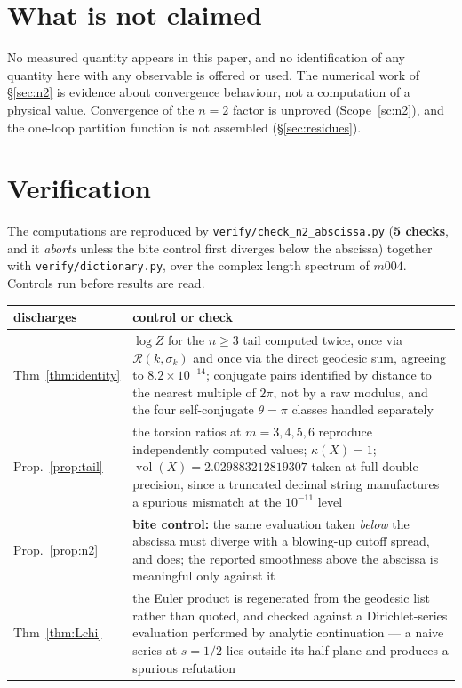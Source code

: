 \documentclass[11pt,a4paper]{article}
\theoremstyle{definition}
\theoremstyle{remark}
\newcommand{\vol}{\operatorname{vol}}
\newcommand{\Rz}{\mathcal{R}}
\begin{document}
\section{What is not claimed}

No measured quantity appears in this paper, and no identification of any quantity here with any
observable is offered or used. The numerical work of \S\ref{sec:n2} is evidence about
convergence behaviour, not a computation of a physical value. Convergence of the $n=2$ factor is
unproved (Scope~\ref{sc:n2}), and the one-loop partition function is not assembled
(\S\ref{sec:residues}).

\appendix

\section{Verification}\label{app:verify}

The computations are reproduced by \texttt{verify/check\_n2\_abscissa.py} (\textbf{5 checks}, and
it \emph{aborts} unless the bite control first diverges below the abscissa) together with
\texttt{verify/dictionary.py}, over the complex length
spectrum of $m004$. Controls run before results are read.

\begin{center}
\begin{tabular}{@{}lp{8.4cm}@{}}
\toprule
discharges & control or check \\
\midrule
Thm~\ref{thm:identity} & $\log Z$ for the $n\ge3$ tail computed twice, once via $\Rz(k,\sigma_k)$ and once via the direct geodesic sum, agreeing to $8.2\times10^{-14}$; conjugate pairs identified by distance to the nearest multiple of $2\pi$, not by a raw modulus, and the four self-conjugate $\theta=\pi$ classes handled separately \\
Prop.~\ref{prop:tail}  & the torsion ratios at $m=3,4,5,6$ reproduce independently computed values; $\kappa(X)=1$; $\vol(X)=2.029883212819307$ taken at full double precision, since a truncated decimal string manufactures a spurious mismatch at the $10^{-11}$ level \\
Prop.~\ref{prop:n2}    & \textbf{bite control:} the same evaluation taken \emph{below} the abscissa must diverge with a blowing-up cutoff spread, and does; the reported smoothness above the abscissa is meaningful only against it \\
Thm~\ref{thm:Lchi}     & the Euler product is regenerated from the geodesic list rather than quoted, and checked against a Dirichlet-series evaluation performed by analytic continuation --- a naive series at $s=1/2$ lies outside its half-plane and produces a spurious refutation \\
\bottomrule
\end{tabular}
\end{center}
\end{document}
